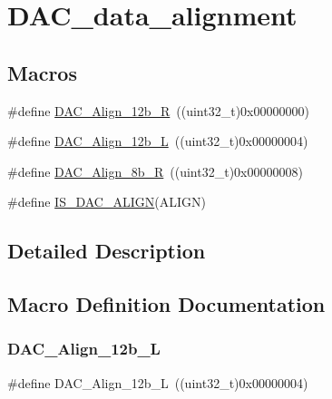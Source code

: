 \hypertarget{group___d_a_c__data__alignment}{}\section{D\+A\+C\+\_\+data\+\_\+alignment}
\label{group___d_a_c__data__alignment}
\subsection*{Macros}
\begin{DoxyCompactItemize}
\item 
\#define \mbox{\hyperlink{group___d_a_c__data__alignment_ga0f2a6fc71aaf90a27b0caf1bd06e73f2}{D\+A\+C\+\_\+\+Align\+\_\+12b\+\_\+R}}~((uint32\+\_\+t)0x00000000)
\item 
\#define \mbox{\hyperlink{group___d_a_c__data__alignment_gaf3a46d37092eac0d4c9c1039e68208d4}{D\+A\+C\+\_\+\+Align\+\_\+12b\+\_\+L}}~((uint32\+\_\+t)0x00000004)
\item 
\#define \mbox{\hyperlink{group___d_a_c__data__alignment_gaa633fbcf85e97e12c4894eaed530dd8f}{D\+A\+C\+\_\+\+Align\+\_\+8b\+\_\+R}}~((uint32\+\_\+t)0x00000008)
\item 
\#define \mbox{\hyperlink{group___d_a_c__data__alignment_ga7779c36606827a6a2c4423414a441bde}{I\+S\+\_\+\+D\+A\+C\+\_\+\+A\+L\+I\+GN}}(A\+L\+I\+GN)
\end{DoxyCompactItemize}


\subsection{Detailed Description}


\subsection{Macro Definition Documentation}
\mbox{\label{group___d_a_c__data__alignment_gaf3a46d37092eac0d4c9c1039e68208d4}} 
\subsubsection{\texorpdfstring{DAC\_Align\_12b\_L}{DAC\_Align\_12b\_L}}
{\footnotesize\ttfamily \#define D\+A\+C\+\_\+\+Align\+\_\+12b\+\_\+L~((uint32\+\_\+t)0x00000004)}

